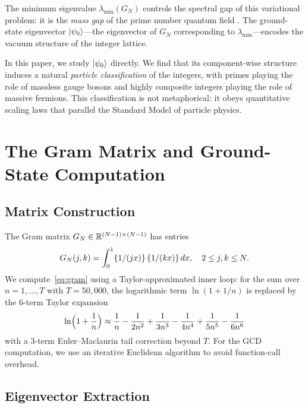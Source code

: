 \documentclass[11pt,a4paper]{article}
\begin{document}
The minimum eigenvalue $\lambda_{\min}(G_N)$ controls the spectral gap of
this variational problem: it is the \emph{mass gap} of the prime number
quantum field \cite{cathedral-physics}. The ground-state eigenvector
$| \psi_0 \rangle$---the eigenvector of $G_N$ corresponding to
$\lambda_{\min}$---encodes the vacuum structure of the integer lattice.

In this paper, we study $| \psi_0 \rangle$ directly. We find that its
component-wise structure induces a natural \emph{particle classification}
of the integers, with primes playing the role of massless gauge bosons
and highly composite integers playing the role of massive fermions.
This classification is not metaphorical: it obeys quantitative scaling
laws that parallel the Standard Model of particle physics.

\section{The Gram Matrix and Ground-State Computation}
\label{sec:gram}

\subsection{Matrix Construction}

The Gram matrix $G_N \in \mathbb{R}^{(N-1) \times (N-1)}$ has entries
\begin{equation}\label{eq:gram}
  G_N(j,k) = \int_0^1 \{1/(jx)\}\,\{1/(kx)\}\,dx,
  \quad 2 \leq j,k \leq N.
\end{equation}
We compute~\eqref{eq:gram} using a Taylor-approximated inner loop:
for the sum over $n = 1, \ldots, T$ with $T = 50{,}000$, the logarithmic
term $\ln(1 + 1/n)$ is replaced by the 6-term Taylor expansion
\begin{equation}
  \ln\Bigl(1 + \frac{1}{n}\Bigr) \approx \frac{1}{n} - \frac{1}{2n^2}
  + \frac{1}{3n^3} - \frac{1}{4n^4} + \frac{1}{5n^5} - \frac{1}{6n^6}
\end{equation}
with a 3-term Euler--Maclaurin tail correction beyond $T$.
For the GCD computation, we use an iterative Euclidean algorithm
to avoid function-call overhead.

\subsection{Eigenvector Extraction}
\end{document}

